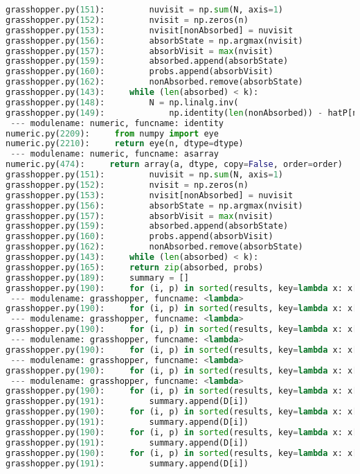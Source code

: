 \documentclass[11pt]{article}
\begin{document}
\begin{lstlisting}[language=Python]
grasshopper.py(151):         nuvisit = np.sum(N, axis=1)
grasshopper.py(152):         nvisit = np.zeros(n)
grasshopper.py(153):         nvisit[nonAbsorbed] = nuvisit
grasshopper.py(156):         absorbState = np.argmax(nvisit)
grasshopper.py(157):         absorbVisit = max(nvisit)
grasshopper.py(159):         absorbed.append(absorbState)
grasshopper.py(160):         probs.append(absorbVisit)
grasshopper.py(162):         nonAbsorbed.remove(absorbState)
grasshopper.py(143):     while (len(absorbed) < k):
grasshopper.py(148):         N = np.linalg.inv(
grasshopper.py(149):             np.identity(len(nonAbsorbed)) - hatP[nonAbsorbed, nonAbsorbed])
 --- modulename: numeric, funcname: identity
numeric.py(2209):     from numpy import eye
numeric.py(2210):     return eye(n, dtype=dtype)
 --- modulename: numeric, funcname: asarray
numeric.py(474):     return array(a, dtype, copy=False, order=order)
grasshopper.py(151):         nuvisit = np.sum(N, axis=1)
grasshopper.py(152):         nvisit = np.zeros(n)
grasshopper.py(153):         nvisit[nonAbsorbed] = nuvisit
grasshopper.py(156):         absorbState = np.argmax(nvisit)
grasshopper.py(157):         absorbVisit = max(nvisit)
grasshopper.py(159):         absorbed.append(absorbState)
grasshopper.py(160):         probs.append(absorbVisit)
grasshopper.py(162):         nonAbsorbed.remove(absorbState)
grasshopper.py(143):     while (len(absorbed) < k):
grasshopper.py(165):     return zip(absorbed, probs)
grasshopper.py(189):     summary = []
grasshopper.py(190):     for (i, p) in sorted(results, key=lambda x: x[0]):
 --- modulename: grasshopper, funcname: <lambda>
grasshopper.py(190):     for (i, p) in sorted(results, key=lambda x: x[0]):
 --- modulename: grasshopper, funcname: <lambda>
grasshopper.py(190):     for (i, p) in sorted(results, key=lambda x: x[0]):
 --- modulename: grasshopper, funcname: <lambda>
grasshopper.py(190):     for (i, p) in sorted(results, key=lambda x: x[0]):
 --- modulename: grasshopper, funcname: <lambda>
grasshopper.py(190):     for (i, p) in sorted(results, key=lambda x: x[0]):
 --- modulename: grasshopper, funcname: <lambda>
grasshopper.py(190):     for (i, p) in sorted(results, key=lambda x: x[0]):
grasshopper.py(191):         summary.append(D[i])
grasshopper.py(190):     for (i, p) in sorted(results, key=lambda x: x[0]):
grasshopper.py(191):         summary.append(D[i])
grasshopper.py(190):     for (i, p) in sorted(results, key=lambda x: x[0]):
grasshopper.py(191):         summary.append(D[i])
grasshopper.py(190):     for (i, p) in sorted(results, key=lambda x: x[0]):
grasshopper.py(191):         summary.append(D[i])

\end{lstlisting}
\end{document}
